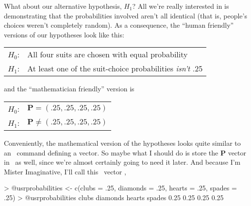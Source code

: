 What about our alternative hypothesis, $H_1$? All we're really interested in is demonstrating that the probabilities involved aren't all identical (that is, people's choices weren't completely random). As a consequence, the ``human friendly'' versions of our hypotheses look like this:

\smallskip
\begin{tabular}{ll}
$H_0$: \hspace*{0.5cm} & All four suits are chosen with equal probability \\
$H_1$: \hspace*{0.5cm} & At least one of the suit-choice probabilities {\it isn't} .25
\end{tabular} 
\smallskip

\noindent
and the ``mathematician friendly'' version is

\smallskip
\begin{tabular}{ll}
$H_0$:\hspace*{0.5cm}  &  $\bm{P} = (.25, .25, .25, .25)$ \\
$H_1$: \hspace*{0.5cm} & $\bm{P} \neq (.25,.25,.25,.25)$ \\
\end{tabular} 
\smallskip


\noindent
Conveniently, the mathematical version of the hypotheses looks quite similar to an \R\ command defining a vector. So maybe what I should do is store the $\bm{P}$ vector in \R\ as well,  since we're almost certainly going to need it later. And because I'm Mister Imaginative, I'll call this \R\ vector ,
\begin{rblock1}
> @usr{probabilities <- c(clubs = .25, diamonds = .25, hearts = .25, spades = .25)} 
> @usr{probabilities}
   clubs diamonds   hearts   spades 
    0.25     0.25     0.25     0.25 
\end{rblock1}



